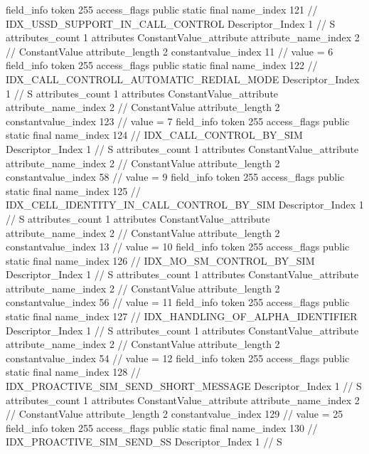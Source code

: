 {{{{{{{				}
				}
			}
			field_info {
				token	255
				access_flags	public static final
				name_index	121		// IDX_USSD_SUPPORT_IN_CALL_CONTROL
				Descriptor_Index	1		// S
				attributes_count	1
				attributes {
				ConstantValue_attribute {
					attribute_name_index	2		// ConstantValue
					attribute_length	2
					constantvalue_index	11		// value = 6
				}
				}
			}
			field_info {
				token	255
				access_flags	public static final
				name_index	122		// IDX_CALL_CONTROLL_AUTOMATIC_REDIAL_MODE
				Descriptor_Index	1		// S
				attributes_count	1
				attributes {
				ConstantValue_attribute {
					attribute_name_index	2		// ConstantValue
					attribute_length	2
					constantvalue_index	123		// value = 7
				}
				}
			}
			field_info {
				token	255
				access_flags	public static final
				name_index	124		// IDX_CALL_CONTROL_BY_SIM
				Descriptor_Index	1		// S
				attributes_count	1
				attributes {
				ConstantValue_attribute {
					attribute_name_index	2		// ConstantValue
					attribute_length	2
					constantvalue_index	58		// value = 9
				}
				}
			}
			field_info {
				token	255
				access_flags	public static final
				name_index	125		// IDX_CELL_IDENTITY_IN_CALL_CONTROL_BY_SIM
				Descriptor_Index	1		// S
				attributes_count	1
				attributes {
				ConstantValue_attribute {
					attribute_name_index	2		// ConstantValue
					attribute_length	2
					constantvalue_index	13		// value = 10
				}
				}
			}
			field_info {
				token	255
				access_flags	public static final
				name_index	126		// IDX_MO_SM_CONTROL_BY_SIM
				Descriptor_Index	1		// S
				attributes_count	1
				attributes {
				ConstantValue_attribute {
					attribute_name_index	2		// ConstantValue
					attribute_length	2
					constantvalue_index	56		// value = 11
				}
				}
			}
			field_info {
				token	255
				access_flags	public static final
				name_index	127		// IDX_HANDLING_OF_ALPHA_IDENTIFIER
				Descriptor_Index	1		// S
				attributes_count	1
				attributes {
				ConstantValue_attribute {
					attribute_name_index	2		// ConstantValue
					attribute_length	2
					constantvalue_index	54		// value = 12
				}
				}
			}
			field_info {
				token	255
				access_flags	public static final
				name_index	128		// IDX_PROACTIVE_SIM_SEND_SHORT_MESSAGE
				Descriptor_Index	1		// S
				attributes_count	1
				attributes {
				ConstantValue_attribute {
					attribute_name_index	2		// ConstantValue
					attribute_length	2
					constantvalue_index	129		// value = 25
				}
				}
			}
			field_info {
				token	255
				access_flags	public static final
				name_index	130		// IDX_PROACTIVE_SIM_SEND_SS
				Descriptor_Index	1		// S
}}}}}
